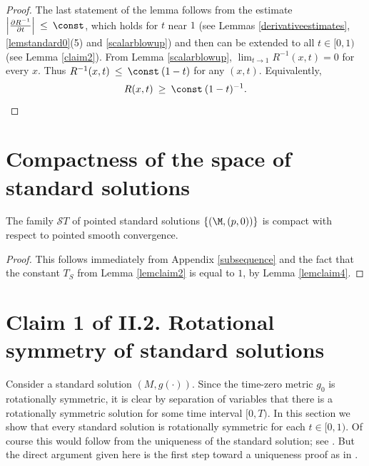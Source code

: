 \begin{proof}
The last statement of the lemma follows from the estimate
$\Big| \frac{\partial R^{-1}}{\partial t} \Big| \: \le \: \const$, which holds
for $t$ near $1$
(see Lemmas \ref{derivativeestimates},
\ref{lemstandard0}(5) and \ref{scalarblowup})
and then can be extended to all $t \in [0,1)$ (see Lemma \ref{claim2}).
From Lemma \ref{scalarblowup}, $\lim_{t \rightarrow 1} R^{-1}(x,t)=0$ for
every $x$.  Thus $R^{-1}(x, t )\: \leq \: \const \: (1-t)$ for any $(x,t)$.
Equivalently,
\begin{equation}
R(x,t) \: \geq \: \const \: (1-t)^{-1}.
\end{equation}
\end{proof}

\section{Compactness of the space of standard solutions}
\label{standardlycompact}

\begin{lemma}
  \label{lem:kl-compactness-space-standard-solutions-compactness-standard-solutions}
 \label{standardcompactness}
The family ${\mathcal ST}$ of pointed standard solutions $\{(\M,(p,0))\}$
is compact with respect to
pointed smooth convergence.
\end{lemma}
\begin{proof}
This follows immediately from  Appendix \ref{subsequence}
and the fact that the constant $T_S$ from Lemma \ref{lemclaim2}
is equal to $1$, by Lemma \ref{lemclaim4}.
\end{proof}


\section{Claim 1 of II.2. Rotational symmetry of standard solutions} \label{claimII.2.1}

Consider a standard solution $(M,g(\cdot))$.
Since the time-zero metric $g_0$ is rotationally symmetric, it is clear
by separation of variables that there is a rotationally symmetric
solution for some time interval $[0, T)$.  In this section we
show that every standard solution is rotationally
symmetric for each $t \in [0,1)$.
Of course this would follow from the uniqueness of the
standard solution; see \cite{Chen-Zhu,Lu-Tian}. But the direct argument given
here is the first step toward a uniqueness proof as in \cite{Lu-Tian}.

